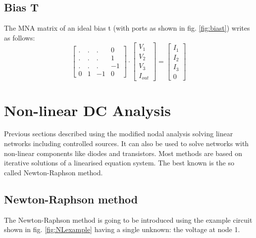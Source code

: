 \documentclass[10pt]{report}
\begin{document}
\subsection{Bias T}

The MNA matrix of an ideal bias t (with ports as shown in
fig. \ref{fig:biast}) writes as follows:
\begin{equation}
\begin{bmatrix}
 . & . & .  &  0\\
 . & . & .  &  1\\
 . & . & .  & -1\\
 0 & 1 & -1 &  0
\end{bmatrix}
\cdot
\begin{bmatrix}
V_{1}\\
V_{2}\\
V_{3}\\
I_{out}
\end{bmatrix}
=
\begin{bmatrix}
I_{1}\\
I_{2}\\
I_{3}\\
0
\end{bmatrix}
\end{equation}

\section{Non-linear DC Analysis}

Previous sections described using the modified nodal analysis solving
linear networks including controlled sources.  It can also be used to
solve networks with non-linear components like diodes and transistors.
Most methods are based on iterative solutions of a linearised equation
system.  The best known is the so called Newton-Raphson method.

\subsection{Newton-Raphson method}

The Newton-Raphson method is going to be introduced using the example
circuit shown in fig. \ref{fig:NLexample} having a single unknown: the
voltage at node 1.
\end{document}
